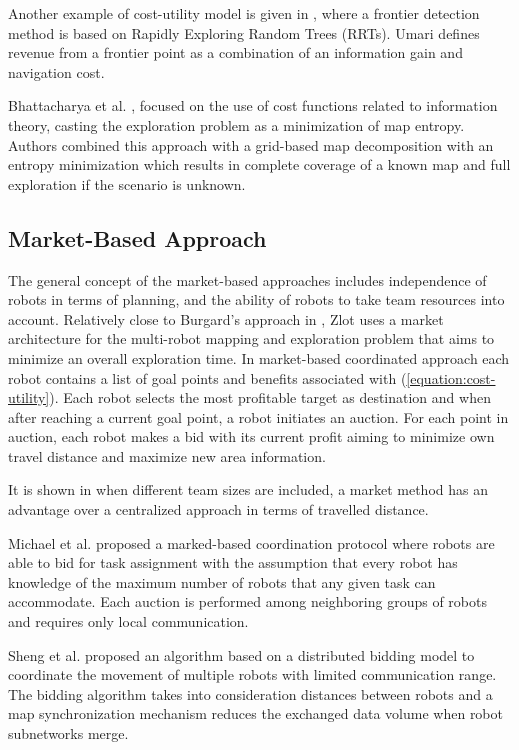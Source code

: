 Another example of cost-utility model is given in \cite{Umari2017}, where a frontier detection method is based on Rapidly Exploring Random Trees (RRTs). Umari defines revenue from a frontier point as a combination of an information gain and navigation cost. 
 
Bhattacharya et al. \cite{Bhattacharya2013}, \cite{BhattacharyaGhrist2013} focused on the use of cost functions related to information theory, casting the exploration problem as a minimization of map entropy. Authors combined this approach with a grid-based map decomposition with an entropy minimization which results in complete coverage of a known map and full exploration if the scenario is unknown. 

\subsection{Market-Based Approach}

The general concept of the market-based approaches includes independence of robots in terms of planning, and the ability of robots to take team resources into account.
Relatively close to Burgard's approach in \cite{Burgard2000}, Zlot \cite{Zlot2002} uses a market architecture for the multi-robot mapping and exploration problem that aims to minimize an overall exploration time. In market-based coordinated approach each robot contains a list of goal points and benefits associated with (\ref{equation:cost-utility}). Each robot selects the most profitable target as destination and when after reaching a current goal point, a robot initiates an auction. For each point in auction, each robot makes a bid with its current profit aiming to minimize own travel distance and maximize new area information.

It is shown in \cite{Dias2003} when different team sizes are included, a market method has an advantage over a centralized approach in terms of travelled distance. 

Michael et al. \cite{Michael2008} proposed a marked-based coordination protocol where robots are able to bid for task assignment with the assumption that every robot has knowledge of the maximum number of robots that any given task can accommodate. Each auction is performed among neighboring groups of robots and requires only local communication.

Sheng et al. \cite{Sheng2006} proposed an algorithm based on a distributed bidding model to coordinate the movement of multiple robots with limited communication range. The bidding algorithm takes into consideration distances between robots and a map synchronization mechanism reduces the exchanged data volume when robot subnetworks merge.

